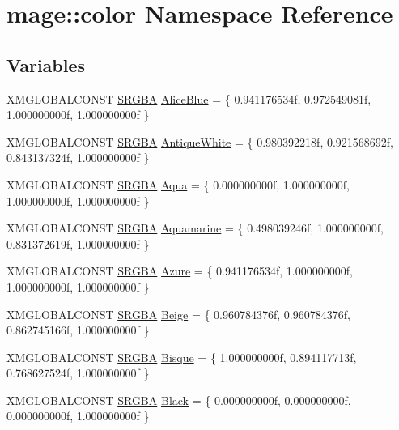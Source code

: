 \hypertarget{namespacemage_1_1color}{}\section{mage\+:\+:color Namespace Reference}
\label{namespacemage_1_1color}
\subsection*{Variables}
\begin{DoxyCompactItemize}
\item 
X\+M\+G\+L\+O\+B\+A\+L\+C\+O\+N\+ST \hyperlink{structmage_1_1_s_r_g_b_a}{S\+R\+G\+BA} \hyperlink{namespacemage_1_1color_ab53ddcebac20b67a9049b8a6f0419c7f}{Alice\+Blue} = \{ 0.\+941176534f, 0.\+972549081f, 1.\+000000000f, 1.\+000000000f \}
\item 
X\+M\+G\+L\+O\+B\+A\+L\+C\+O\+N\+ST \hyperlink{structmage_1_1_s_r_g_b_a}{S\+R\+G\+BA} \hyperlink{namespacemage_1_1color_a31f9b8363eb47f4ba0a67ef2228c8d3c}{Antique\+White} = \{ 0.\+980392218f, 0.\+921568692f, 0.\+843137324f, 1.\+000000000f \}
\item 
X\+M\+G\+L\+O\+B\+A\+L\+C\+O\+N\+ST \hyperlink{structmage_1_1_s_r_g_b_a}{S\+R\+G\+BA} \hyperlink{namespacemage_1_1color_a21c05fb85147ebac8af465293996ebfc}{Aqua} = \{ 0.\+000000000f, 1.\+000000000f, 1.\+000000000f, 1.\+000000000f \}
\item 
X\+M\+G\+L\+O\+B\+A\+L\+C\+O\+N\+ST \hyperlink{structmage_1_1_s_r_g_b_a}{S\+R\+G\+BA} \hyperlink{namespacemage_1_1color_aa3c3740abf00170c3c80bcad52b8b1d1}{Aquamarine} = \{ 0.\+498039246f, 1.\+000000000f, 0.\+831372619f, 1.\+000000000f \}
\item 
X\+M\+G\+L\+O\+B\+A\+L\+C\+O\+N\+ST \hyperlink{structmage_1_1_s_r_g_b_a}{S\+R\+G\+BA} \hyperlink{namespacemage_1_1color_ab63edad9b98f694796f82171f9312008}{Azure} = \{ 0.\+941176534f, 1.\+000000000f, 1.\+000000000f, 1.\+000000000f \}
\item 
X\+M\+G\+L\+O\+B\+A\+L\+C\+O\+N\+ST \hyperlink{structmage_1_1_s_r_g_b_a}{S\+R\+G\+BA} \hyperlink{namespacemage_1_1color_a7f93ba4f8295f50eca69d7212a9d8a3b}{Beige} = \{ 0.\+960784376f, 0.\+960784376f, 0.\+862745166f, 1.\+000000000f \}
\item 
X\+M\+G\+L\+O\+B\+A\+L\+C\+O\+N\+ST \hyperlink{structmage_1_1_s_r_g_b_a}{S\+R\+G\+BA} \hyperlink{namespacemage_1_1color_a397d8ebb40db6a607c30b64ad73572cc}{Bisque} = \{ 1.\+000000000f, 0.\+894117713f, 0.\+768627524f, 1.\+000000000f \}
\item 
X\+M\+G\+L\+O\+B\+A\+L\+C\+O\+N\+ST \hyperlink{structmage_1_1_s_r_g_b_a}{S\+R\+G\+BA} \hyperlink{namespacemage_1_1color_a847b3e3bd2697a815deaa417ac74cd87}{Black} = \{ 0.\+000000000f, 0.\+000000000f, 0.\+000000000f, 1.\+000000000f \}

\end{DoxyCompactItemize}
